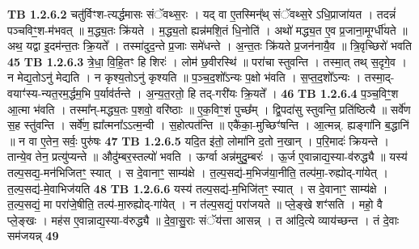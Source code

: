 \documentclass[17pt]{extarticle}
\begin{document}
                  \newline
                                \textbf{ TB 1.2.6.2} \newline
                  चतु॑र्विꣳश-त्यर्द्धमासः संॅवथ्स॒रः । यद् वा ए॒तस्मिन्᳚थ् संॅवथ्स॒रे ऽधि॒प्राजा॑यत । तदन्नं॑ पञ्चविꣳ॒॒श-म॑भवत् ॥ म॒द्ध्य॒तः क्रि॑यते । म॒द्ध्य॒तो ह्यन्न॑मशि॒तं धि॒नोति॑ । अथो॑ मद्ध्य॒त ए॒व प्र॒जाना॒मूर्ग्धी॑यते ॥ अथ॒ यद्वा इ॒दम॑न्त॒तः क्रि॒यते᳚ । तस्मा॑दुद॒न्ते प्र॒जाः समे॑धन्ते । अ॒न्त॒तः क्रि॑यते प्र॒जन॑नायै॒व ॥ त्रि॒वृच्छिरो॑ भवति \textbf{ 45} \newline
                  \newline
                                \textbf{ TB 1.2.6.3} \newline
                  त्रे॒धा॒ वि॒हि॒तꣳ हि शिरः॑ । लोम॑ छ॒वीरस्थि॑ ॥ परा॑चा स्तुवन्ति । तस्मा॒त् तथ् स॒दृगे॒व । न मेद्य॒तोऽनु॑ मेद्यति । न कृश्य॒तोऽनु॑ कृश्यति ॥ प॒ञ्च॒द॒शो᳚ऽन्यः प॒क्षो भ॑वति । स॒प्त॒द॒शो᳚ऽन्यः । तस्मा॒द्-वयाꣳ॑स्य-न्यत॒रम॒र्द्धम॒भि प॒र्याव॑र्तन्ते । अ॒न्य॒त॒रतो॒ हि तद्-गरी॑यः क्रि॒यते᳚ । \textbf{ 46} \newline
                  \newline
                                \textbf{ TB 1.2.6.4} \newline
                  प॒ञ्च॒विꣳ॒॒श आ॒त्मा भ॑वति । तस्मा᳚न्-मद्ध्य॒तः प॒शवो॒ वरि॑ष्ठाः ॥ ए॒क॒विꣳ॒॒शं पुच्छ᳚म् । द्वि॒पदा॑सु स्तुवन्ति॒ प्रति॑ष्ठित्यै ॥ सर्वे॑ण स॒ह स्तु॑वन्ति । सर्वे॑ण॒ ह्या᳚त्मना᳚ऽऽत्म॒न्वी । स॒होत्पत॑न्ति ॥ एकै॑का॒-मुच्छिꣳ॑षन्ति । आ॒त्मन्न्. ह्यङ्गा॑नि ब॒द्धानि॑ ॥ न वा ए॒तेन॒ सर्वः॒ पुरु॑षः \textbf{ 47} \newline
                  \newline
                                \textbf{ TB 1.2.6.5} \newline
                  यदि॒त इ॑तो॒ लोमा॑नि द॒तो न॒खान् । प॒रि॒मादः॑ क्रियन्ते । तान्ये॒व तेन॒ प्रत्यु॑प्यन्ते ॥ औदु॑म्बर॒स्तल्पो॑ भवति । ऊर्ग्वा अन्न॑मुदु॒म्बरः॑ । ऊ॒र्ज ए॒वान्नाद्य॒स्या-व॑रुद्ध्यै ॥ यस्य॑ तल्प॒सद्य॒-मन॑भिजितꣳ॒॒ स्यात् । स दे॒वानाꣳ॒॒ साम्य॑क्षे । त॒ल्प॒सद्य॑-म॒भिज॑या॒नीति॒ तल्प॑मा॒-रुह्योद्-गा॑येत् । त॒ल्प॒सद्य॑-मे॒वाभिज॑यति \textbf{ 48} \newline
                  \newline
                                \textbf{ TB 1.2.6.6} \newline
                  यस्य॑ तल्प॒सद्य॑-म॒भिजि॑तꣳ॒॒ स्यात् । स दे॒वानाꣳ॒॒ साम्य॑क्षे । त॒ल्प॒सद्यं॒ मा परा॑जे॒षीति॒ तल्प॑-मा॒रुह्योद्-गा॑येत् । न त॑ल्प॒सद्यं॒ परा॑जयते ॥ प्ले॒ङ्खे शꣳ॑सति । महो॒ वै प्ले॒ङ्खः । मह॑स ए॒वान्नाद्य॒स्या-व॑रुद्ध्यै ॥ दे॒वा॒सु॒राः संॅय॑त्ता आसन्न् । त आ॑दि॒त्ये व्याय॑च्छन्त । तं दे॒वाः सम॑जयन्न् \textbf{ 49} \newline
\end{document}
